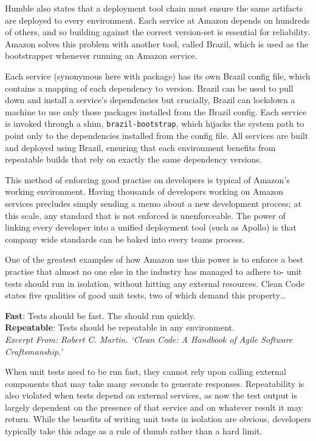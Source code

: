 \documentclass[11pt]{article}
\begin{document}
Humble also states that a deployment tool chain must ensure the same artifacts
are deployed to every environment. Each service at Amazon depends on hundreds of
others, and so building against the correct version-set is essential for
reliability. Amazon solves this problem with another tool, called Brazil, which
is used as the bootstrapper whenever running an Amazon service.

Each service (synonymous here with package) has its own Brazil config file,
which contains a mapping of each dependency to version. Brazil can be used to
pull down and install a service's dependencies but crucially, Brazil can
lockdown a machine to use only those packages installed from the Brazil config.
Each service is invoked through a shim, \texttt{brazil-bootstrap}, which hijacks
the system path to point only to the dependencies installed from the config
file.  All services are built and deployed using Brazil, ensuring that each
environment benefits from repeatable builds that rely on exactly the same
dependency versions.

This method of enforcing good practise on developers is typical of Amazon's
working environment. Having thousands of developers working on Amazon services
precludes simply sending a memo about a new development process; at this scale,
any standard that is not enforced is unenforceable. The power of linking every
developer into a unified deployment tool (such as Apollo) is that company wide
standards can be baked into every teams process.

One of the greatest examples of how Amazon use this power is to enforce a best
practise that almost no one else in the industry has managed to adhere to- unit
tests should run in isolation, without hitting any external resources. Clean
Code~\cite{cleanCode} states five qualities of good unit tests, two of which
demand this property\dots

\begin{displayquote}

  \textbf{Fast}: Tests should be fast. The should run quickly. \\
  \textbf{Repeatable}: Tests should be repeatable in any environment. \\

  \textit{Excerpt From: Robert C. Martin. `Clean Code: A Handbook of Agile
  Software Craftsmanship.'}

\end{displayquote}

When unit tests need to be run fast, they cannot rely upon calling external
components that may take many seconds to generate responses. Repeatability is
also violated when tests depend on external services, as now the test output is
largely dependent on the presence of that service and on whatever result it may
return. While the benefits of writing unit tests in isolation are obvious,
developers typically take this adage as a rule of thumb rather than a hard
limit.
\end{document}
